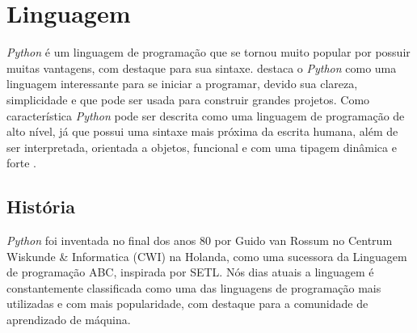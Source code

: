 \chapter{Linguagem}
\indent \textit{Python} é um linguagem de programação que se tornou muito popular por possuir muitas vantagens, com destaque para sua sintaxe. \cite{menezes2010introduccao} destaca o \textit{Python} como uma linguagem interessante para se iniciar a programar, devido sua clareza, simplicidade e que pode ser usada para construir grandes projetos. Como característica \textit{Python} pode ser descrita como uma linguagem de programação de alto nível, já que possui uma sintaxe mais próxima da escrita humana, além de ser interpretada, orientada a objetos, funcional e com uma tipagem dinâmica e forte \cite{wiki:python}.

\section{História}

\indent \textit{Python} foi inventada no final dos anos 80 por Guido van Rossum no Centrum Wiskunde \& Informatica (CWI) na Holanda, como uma sucessora da Linguagem de programação ABC, inspirada por SETL. Nós dias atuais a linguagem é constantemente classificada como uma das linguagens de programação mais utilizadas e com mais popularidade, com destaque para a comunidade de aprendizado de máquina. \cite{wiki:python}